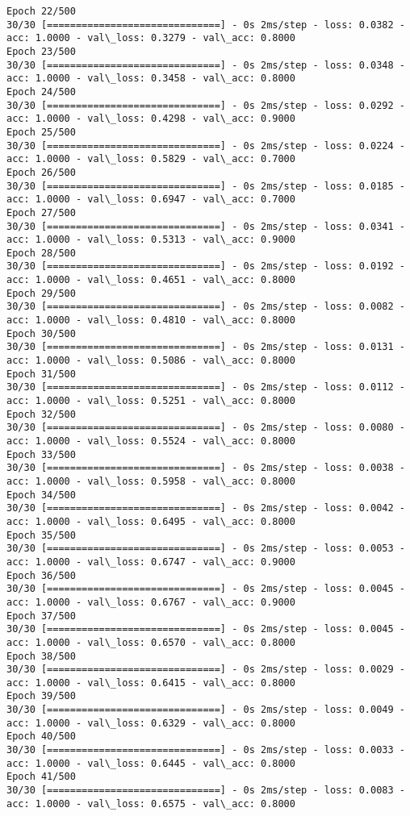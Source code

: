\documentclass[11pt]{article}
\begin{document}
\begin{Verbatim}[commandchars=\\\{\}]
Epoch 22/500
30/30 [==============================] - 0s 2ms/step - loss: 0.0382 - acc: 1.0000 - val\_loss: 0.3279 - val\_acc: 0.8000
Epoch 23/500
30/30 [==============================] - 0s 2ms/step - loss: 0.0348 - acc: 1.0000 - val\_loss: 0.3458 - val\_acc: 0.8000
Epoch 24/500
30/30 [==============================] - 0s 2ms/step - loss: 0.0292 - acc: 1.0000 - val\_loss: 0.4298 - val\_acc: 0.9000
Epoch 25/500
30/30 [==============================] - 0s 2ms/step - loss: 0.0224 - acc: 1.0000 - val\_loss: 0.5829 - val\_acc: 0.7000
Epoch 26/500
30/30 [==============================] - 0s 2ms/step - loss: 0.0185 - acc: 1.0000 - val\_loss: 0.6947 - val\_acc: 0.7000
Epoch 27/500
30/30 [==============================] - 0s 2ms/step - loss: 0.0341 - acc: 1.0000 - val\_loss: 0.5313 - val\_acc: 0.9000
Epoch 28/500
30/30 [==============================] - 0s 2ms/step - loss: 0.0192 - acc: 1.0000 - val\_loss: 0.4651 - val\_acc: 0.8000
Epoch 29/500
30/30 [==============================] - 0s 2ms/step - loss: 0.0082 - acc: 1.0000 - val\_loss: 0.4810 - val\_acc: 0.8000
Epoch 30/500
30/30 [==============================] - 0s 2ms/step - loss: 0.0131 - acc: 1.0000 - val\_loss: 0.5086 - val\_acc: 0.8000
Epoch 31/500
30/30 [==============================] - 0s 2ms/step - loss: 0.0112 - acc: 1.0000 - val\_loss: 0.5251 - val\_acc: 0.8000
Epoch 32/500
30/30 [==============================] - 0s 2ms/step - loss: 0.0080 - acc: 1.0000 - val\_loss: 0.5524 - val\_acc: 0.8000
Epoch 33/500
30/30 [==============================] - 0s 2ms/step - loss: 0.0038 - acc: 1.0000 - val\_loss: 0.5958 - val\_acc: 0.8000
Epoch 34/500
30/30 [==============================] - 0s 2ms/step - loss: 0.0042 - acc: 1.0000 - val\_loss: 0.6495 - val\_acc: 0.8000
Epoch 35/500
30/30 [==============================] - 0s 2ms/step - loss: 0.0053 - acc: 1.0000 - val\_loss: 0.6747 - val\_acc: 0.9000
Epoch 36/500
30/30 [==============================] - 0s 2ms/step - loss: 0.0045 - acc: 1.0000 - val\_loss: 0.6767 - val\_acc: 0.9000
Epoch 37/500
30/30 [==============================] - 0s 2ms/step - loss: 0.0045 - acc: 1.0000 - val\_loss: 0.6570 - val\_acc: 0.8000
Epoch 38/500
30/30 [==============================] - 0s 2ms/step - loss: 0.0029 - acc: 1.0000 - val\_loss: 0.6415 - val\_acc: 0.8000
Epoch 39/500
30/30 [==============================] - 0s 2ms/step - loss: 0.0049 - acc: 1.0000 - val\_loss: 0.6329 - val\_acc: 0.8000
Epoch 40/500
30/30 [==============================] - 0s 2ms/step - loss: 0.0033 - acc: 1.0000 - val\_loss: 0.6445 - val\_acc: 0.8000
Epoch 41/500
30/30 [==============================] - 0s 2ms/step - loss: 0.0083 - acc: 1.0000 - val\_loss: 0.6575 - val\_acc: 0.8000

\end{Verbatim}
\end{document}
